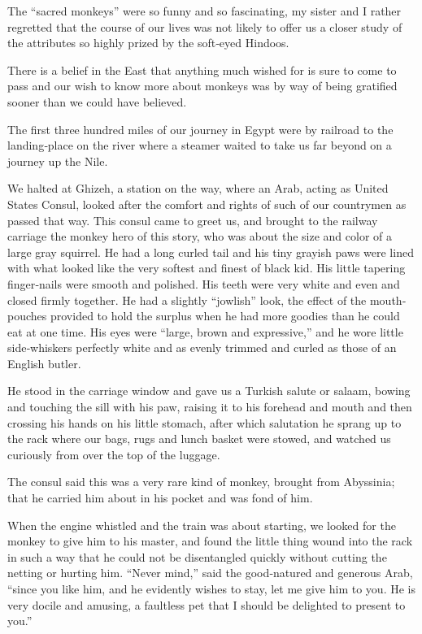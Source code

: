 \documentclass[12pt]{book}
\begin{document}
The “sacred monkeys” were so funny and so fascinating, my sister and I rather
regretted that the course of our lives was not likely to offer us a closer study of
the attributes so highly prized by the soft‐eyed Hindoos.

There is a belief in the East that anything much wished for is sure to come to
pass and our wish to know more about monkeys was by way of being gratified
sooner than we could have believed.

The first three hundred miles of our journey in Egypt were by railroad to the
landing‐place on the river where a steamer waited to take us far beyond on a
journey up the Nile.

We halted at Ghizeh, a station on the way, where an Arab, acting as United
States Consul, looked after the comfort and rights of such of our countrymen
as passed that way. This consul came to greet us, and brought to the railway
carriage the monkey hero of this story, who was about the size and color of a
large gray squirrel. He had a long curled tail and his tiny grayish paws were
lined with what looked like the very softest and finest of black kid. His little
tapering finger‐nails were smooth and polished. His teeth were very white and
even and closed firmly together. He had a slightly “jowlish” look, the effect of the
mouth‐pouches provided to hold the surplus when he had more goodies than he
could eat at one time. His eyes were “large, brown and expressive,” and he wore
little side‐whiskers perfectly white and as evenly trimmed and curled as those of
an English butler.

He stood in the carriage window and gave us a Turkish salute or salaam,
bowing and touching the sill with his paw, raising it to his forehead and mouth
and then crossing his hands on his little stomach, after which salutation he sprang
up to the rack where our bags, rugs and lunch basket were stowed, and watched
us curiously from over the top of the luggage.

The consul said this was a very rare kind of monkey, brought from Abyssinia;
that he carried him about in his pocket and was fond of him.

When the engine whistled and the train was about starting, we looked for
the monkey to give him to his master, and found the little thing wound into the
rack in such a way that he could not be disentangled quickly without cutting the
netting or hurting him. “Never mind,” said the good‐natured and generous Arab,
“since you like him, and he evidently wishes to stay, let me give him to you. He is
very docile and amusing, a faultless pet that I should be delighted to present to
you.”
\end{document}
